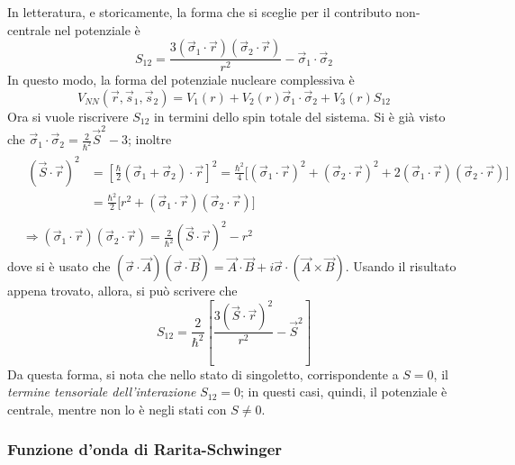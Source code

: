 \documentclass[11pt, a4paper]{scrartcl}
\theoremstyle{style}
\numberwithin{equation}{subsection}
\begin{document}
In letteratura, e storicamente, la forma che si sceglie per il contributo non-centrale nel potenziale \`e 
\begin{equation}
	S_{12} = \frac{3 (\vec{\sigma }_1 \cdot \vec{r}) (\vec{\sigma }_2 \cdot \vec{r})}{r^2} - \vec{\sigma }_1 \cdot \vec{\sigma }_2
\end{equation}
In questo modo, la forma del potenziale nucleare complessiva \`e
\begin{equation}
	V_{N N}(\vec{r}, \vec{s}_1 ,\vec{s}_2) = V_1(r) + V_2(r) \vec{\sigma }_1 \cdot \vec{\sigma }_2 + V_3(r) S_{12}
\end{equation}
Ora si vuole riscrivere $S_{12}$ in termini dello spin totale del sistema.
Si \`e gi\`a visto che $\vec{\sigma }_1 \cdot \vec{\sigma }_2 = \frac{2}{\hbar ^2}\vec{S}^2 - 3$; inoltre
\[
	\begin{split}
		&\begin{split}
	(\vec{S}\cdot \vec{r})^2 &= \left[ \frac{\hbar}{2} (\vec{\sigma }_1 + \vec{\sigma }_2) \cdot \vec{r} \right] ^2= \frac{\hbar ^2}{4} \Big[(\vec{\sigma }_1 \cdot \vec{r})^2 + (\vec{\sigma }_2 \cdot \vec{r})^2 + 2 (\vec{\sigma }_1 \cdot \vec{r}) (\vec{\sigma }_2\cdot \vec{r})\Big]\\
				 &=\frac{\hbar^2}{2} \big[ r^2 + (\vec{\sigma }_1 \cdot \vec{r}) ( \vec{\sigma }_2 \cdot \vec{r}) \big] 
\end{split}\\
		&\Rightarrow (\vec{\sigma }_1 \cdot \vec{r}) (\vec{\sigma }_2 \cdot \vec{r}) = \frac{2}{\hbar ^2} (\vec{S}\cdot \vec{r})^2 - r^2
	\end{split}
\] 
dove si \`e usato che $(\vec{\sigma }\cdot \vec{A}) (\vec{\sigma }\cdot \vec{B}) = \vec{A} \cdot \vec{B} + i \vec{\sigma }\cdot (\vec{A}\times \vec{B})$.
Usando il risultato appena trovato, allora, si pu\`o scrivere che 
\begin{equation}
	S_{12} = \frac{2}{\hbar ^2} \left[ \frac{3 (\vec{S} \cdot \vec{r})^2}{r^2} - \vec{S}^2 \right] 
\end{equation}
Da questa forma, si nota che nello stato di singoletto, corrispondente a $S=0$, il \textit{termine tensoriale dell'interazione} $S_{12}=0$; in questi casi, quindi, il potenziale \`e centrale, mentre non lo \`e negli stati con $S \neq 0$.

\subsubsection{Funzione d'onda di Rarita-Schwinger}
\end{document}
